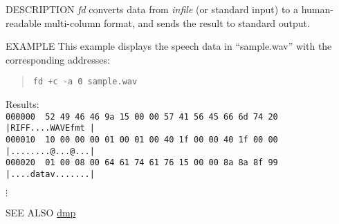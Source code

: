 \begin{synopsis}
 \item [fd] [ --a $A$ ] [ --n $N$ ] [ --m $M$ ] [ --{\em ent} ] 
	    [ +{\em type} ] [ $\%${\em form} ] [ {\em infile} ]
\end{synopsis}

\begin{qsection}{DESCRIPTION}
{\em fd} converts data from {\em infile} (or standard input) 
to a human-readable multi-column format, 
and sends the result to standard output.
\end{qsection}

\begin{options}
\end{options}

\begin{qsection}{EXAMPLE}
 This example displays the speech data in ``sample.wav'' with
 the corresponding addresses:
\begin{quote}
 \verb!fd +c -a 0 sample.wav!
\end{quote}
 Results:\\
\verb!000000  52 49 46 46 9a 15 00 00 57 41 56 45 66 6d 74 20 |RIFF....WAVEfmt |!\\
\verb!000010  10 00 00 00 01 00 01 00 40 1f 00 00 40 1f 00 00 |........@...@...|!\\
\verb!000020  01 00 08 00 64 61 74 61 76 15 00 00 8a 8a 8f 99 |....datav.......|!

\begin{center}
 $\vdots$\\
\end{center}
\end{qsection}

\begin{qsection}{SEE ALSO}
\hyperlink{dmp}{dmp}
\end{qsection}
